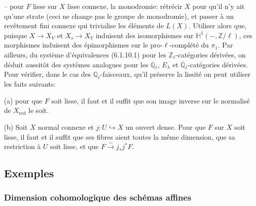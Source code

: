 \documentclass[12pt,a4paper]{article}
\theoremstyle{plain}
\theoremstyle{definition}
\theoremstyle{remark}
\newcommand{\HH}{\mathbb{H}}
\newcommand{\QQ}{\mathbb{Q}}
\newcommand{\ZZ}{\mathbb{Z}}
\begin{document}
-- pour $F$ lisse sur $X$ lisse connexe, la monodromie: r\'etr\'ecir $X$ pour qu'il n'y ait qu'une strate (ceci ne change pas le groupe de monodromie), et passer \`a un rev\^etement fini connexe qui trivialise les \'el\'ements de $L(X)$. Utiliser alors que, puisque $X \to X_V$ et $X_s \to X_V$ induisent des isomorphismes sur $\HH^1(-, \ZZ/\ell)$, ces morphismes induisent des \'epimorphismes sur le pro-$\ell$-compl\'et\'e du $\pi_1$. Par ailleurs, du syst\`eme d'\'equivalences (6.1.10.1) pour les $\ZZ_{\ell}$-cat\'egories d\'eriv\'ees, on d\'eduit aussit\^ot des syst\`emes analogues pour les $\QQ_{\ell}$, $E_{\lambda}$ et $\overline{\QQ}_{\ell}$-cat\'egories d\'eriv\'ees. Pour v\'erifier, dans le cas des $\QQ_{\ell}$-faisceaux, qu'il pr\'eserve la lissit\'e on peut utiliser les faits suivants:

(a) pour que $F$ soit lisse, il faut et il suffit que son image inverse sur le normalis\'e de $X_{\text{red}}$ le soit.

(b) Soit $X$ normal connexe et $j: U \hookrightarrow X$ un ouvert dense. Pour que $F$ sur $X$ soit lisse, il faut et il suffit que ses fibres aient toutes la m\^eme dimension, que sa restriction \`a $U$ soit lisse, et que $F \xrightarrow{\sim} j_*j^*F$.

\subsection{Exemples}

\subsubsection{Dimension cohomologique des sch\'emas affines}
\end{document}
